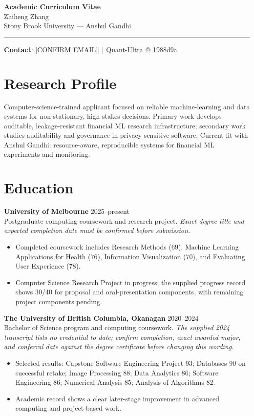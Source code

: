\documentclass[11pt]{article}
\makeatletter
\newcommand{\ApplicantName}{Zhiheng Zhang}
\newcommand{\ApplicantEmail}{[CONFIRM EMAIL]}
\newcommand{\ApplicantPhone}{[CONFIRM PHONE]}
\newcommand{\ApplicantGitHub}{\href{https://github.com/zhiheng-zhang-Mera/Quant-Ultra/tree/1988d9a8530da91a8158de864d098ea869098923}{Quant-Ultra @ 1988d9a}}
\makeatother
\begin{document}
\begin{center}
{\LARGE\bfseries Academic Curriculum Vitae}\\[0.25em]
{\large \ApplicantName}\\
Stony Brook University --- Anshul Gandhi
\end{center}
\vspace{0.35em}\hrule\vspace{0.65em}

\textbf{Contact}: \ApplicantEmail\quad | \quad \ApplicantPhone\quad | \quad \ApplicantGitHub

\section*{Research Profile}
Computer-science-trained applicant focused on reliable machine-learning and data systems for non-stationary, high-stakes decisions. Primary work develops auditable, leakage-resistant financial ML research infrastructure; secondary work studies auditability and governance in privacy-sensitive software. Current fit with Anshul Gandhi: resource-aware, reproducible systems for financial ML experiments and monitoring.

\section*{Education}
\textbf{University of Melbourne} \hfill 2025--present\\
Postgraduate computing coursework and research project. \textit{Exact degree title and expected completion date must be confirmed before submission.}
\begin{itemize}
\item Completed coursework includes Research Methods (69), Machine Learning Applications for Health (76), Information Visualization (70), and Evaluating User Experience (78).
\item Computer Science Research Project in progress; the supplied progress record shows 30/40 for proposal and oral-presentation components, with remaining project components pending.
\end{itemize}

\textbf{The University of British Columbia, Okanagan} \hfill 2020--2024\\
Bachelor of Science program and computing coursework. \textit{The supplied 2024 transcript lists no credential to date; confirm completion, exact awarded major, and conferral date against the degree certificate before changing this wording.}
\begin{itemize}
\item Selected results: Capstone Software Engineering Project 93; Databases 90 on successful retake; Image Processing 88; Data Analytics 86; Software Engineering 86; Numerical Analysis 85; Analysis of Algorithms 82.
\item Academic record shows a clear later-stage improvement in advanced computing and project-based work.
\end{itemize}
\end{document}
